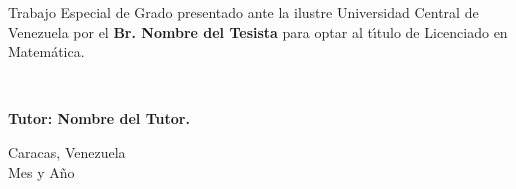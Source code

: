 \vspace{3cm}

\hspace{6cm}
\begin{minipage}[t]{8cm}
\begin{large}
Trabajo Especial de Grado presentado ante la ilustre Universidad Central de Venezuela por el
\textbf{Br. Nombre del Tesista} para optar al t\'{\i}tulo de Licenciado en Matem\'atica.

\

\textbf{Tutor: Nombre del Tutor.}
\end{large}
\end{minipage}







\vspace{2cm}

\begin{center}
Caracas, Venezuela \\
Mes y A\~no
\end{center}

\newpage
